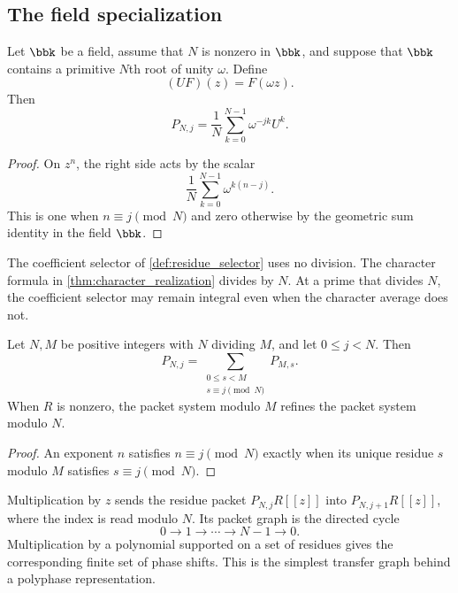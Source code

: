 \subsection{The field specialization}
\begin{theorem}\label{thm:character_realization}
Let $\bbk$ be a field, assume that $N$ is nonzero in $\bbk$, and suppose that $\bbk$ contains a primitive $N$th root of unity $\omega$.  Define
\[
(UF)(z)=F(\omega z).
\]
Then
\[
P_{N,j}
=
\frac1N\sum_{k=0}^{N-1}\omega^{-jk}U^k.
\]
\end{theorem}

\begin{proof}
On $z^n$, the right side acts by the scalar
\[
\frac1N\sum_{k=0}^{N-1}\omega^{k(n-j)}.
\]
This is one when $n\equiv j\pmod N$ and zero otherwise by the geometric sum identity in the field $\bbk$.
\end{proof}

\begin{remark}\label{rem:selector_character}
The coefficient selector of \cref{def:residue_selector} uses no division.  The character formula in \cref{thm:character_realization} divides by $N$.  At a prime that divides $N$, the coefficient selector may remain integral even when the character average does not.
\end{remark}

\begin{theorem}\label{thm:residue_refinement}\label{thm:polyphase-refinement}
Let $N,M$ be positive integers with $N$ dividing $M$, and let $0\leq j<N$.  Then
\[
P_{N,j}
=
\sum_{\substack{0\leq s<M\\s\equiv j\pmod N}}P_{M,s}.
\]
When $R$ is nonzero, the packet system modulo $M$ refines the packet system modulo $N$.
\end{theorem}

\begin{proof}
An exponent $n$ satisfies $n\equiv j\pmod N$ exactly when its unique residue $s$ modulo $M$ satisfies $s\equiv j\pmod N$.
\end{proof}

\begin{example}\label{ex:residue_shift}
Multiplication by $z$ sends the residue packet $P_{N,j}R[[z]]$ into $P_{N,j+1}R[[z]]$, where the index is read modulo $N$.  Its packet graph is the directed cycle
\[
0\longrightarrow1\longrightarrow\cdots\longrightarrow N-1\longrightarrow0.
\]
Multiplication by a polynomial supported on a set of residues gives the corresponding finite set of phase shifts.  This is the simplest transfer graph behind a polyphase representation.
\end{example}

